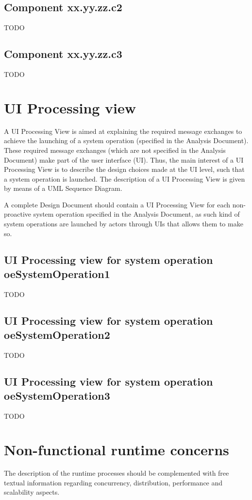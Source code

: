 \subsection{Component xx.yy.zz.c2}
TODO

\subsection{Component xx.yy.zz.c3}
TODO





\section{UI Processing view}
A \gls{UI Processing View} is aimed at explaining the required message exchanges
to achieve the launching of a system operation (specified in the \msrmessir
Analysis Document). These required message exchanges (which are not specified in
the \msrmessir Analysis Document) make part of the user interface (UI). Thus, the
main interest of a UI Processing View is to describe the design choices made
at the UI level, such that a system operation is launched. The description
of a UI Processing View is given by means of a UML Sequence Diagram. 


A complete Design Document should contain a UI Processing View for each
non-proactive system operation specified in the \msrmessir Analysis Document, as
such kind of system operations are launched by actors through UIs that allows
them to make so. 



\subsection{UI Processing view for system operation oeSystemOperation1}
TODO

 
\subsection{UI Processing view for system operation oeSystemOperation2}
TODO


\subsection{UI Processing view for system operation oeSystemOperation3}
TODO





\section{Non-functional runtime concerns}
The description of the runtime processes should be complemented with free
textual information regarding concurrency, distribution, performance and scalability aspects.


